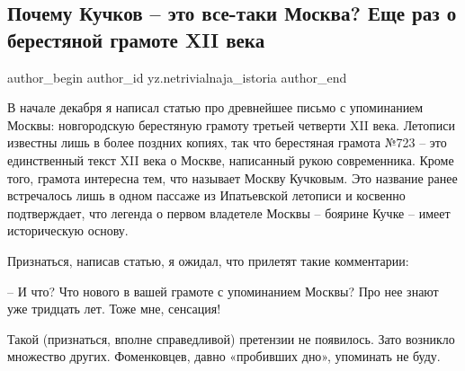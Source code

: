  
 
 
 
 
 
\subsection{Почему Кучков – это все-таки Москва? Еще раз о берестяной грамоте XII века}
\label{sec:22_12_2020.sites.ru.zen_yandex.yz.netrivialnaja_istoria.1.kuchkov_moskva}
\ifcmt
	author_begin
   author_id yz.netrivialnaja_istoria
	author_end
\fi

В начале декабря я написал статью про древнейшее письмо с упоминанием Москвы:
новгородскую берестяную грамоту третьей четверти XII века. Летописи известны
лишь в более поздних копиях, так что берестяная грамота №723 – это единственный
текст XII века о Москве, написанный рукою современника. Кроме того, грамота
интересна тем, что называет Москву Кучковым. Это название ранее встречалось
лишь в одном пассаже из Ипатьевской летописи и косвенно подтверждает, что
легенда о первом владетеле Москвы – боярине Кучке – имеет историческую основу.


Признаться, написав статью, я ожидал, что прилетят такие комментарии:

– И что? Что нового в вашей грамоте с упоминанием Москвы? Про нее знают уже
тридцать лет. Тоже мне, сенсация!

Такой (признаться, вполне справедливой) претензии не появилось. Зато возникло
множество других. Фоменковцев, давно «пробивших дно», упоминать не буду.

